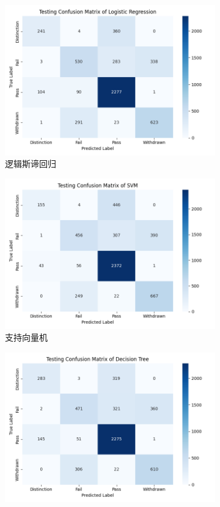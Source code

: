 \documentclass[a4paper, utf8]{ctexart}
\begin{document}
	\begin{figure}
		\centering
		\begin{subfigure}{.32\textwidth}
			\centering
			\includegraphics[width=\textwidth]{./figure/test_lr.png}
			\caption{逻辑斯谛回归}
		\end{subfigure}
		\begin{subfigure}{.32\textwidth}
			\centering
			\includegraphics[width=\textwidth]{./figure/test_svm.png}
			\caption{支持向量机}
		\end{subfigure}
		\begin{subfigure}{.32\textwidth}
			\centering
			\includegraphics[width=\textwidth]{./figure/test_cart.png}

\end{subfigure}
\end{figure}
\end{document}

